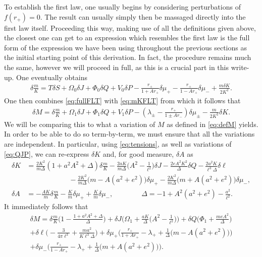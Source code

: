 \documentclass[
twoside,
openright,
frontopenright,
]{dmathesis}
\newcommand{\nn}{\nonumber}
\begin{document}
To establish the first law, one usually begins by considering perturbations of
$f(r_+)=0$. The result can usually simply then be massaged directly into the
first law itself. Proceeding this way, making use of all the definitions given
above, the closest one can get to an expression which resembles the first law is
the full form of the expression we have been using throughout the previous
sections as the initial starting point of this derivation. In fact, the
procedure remains much the same, however we will proceed in full, as this is a
crucial part in this write-up. One eventually obtains
\begin{align}\label{eq:mKFLT}
\delta \frac{m}{K} = T\delta S + \Omega_0 \delta J + \Phi_0 \delta Q + V_0
  \delta P - \frac{r_+}{1+Ar_+} \delta \mu_+ - \frac{r_+}{1-Ar_+}\delta \mu_-
  +\frac{m\delta K}{2K^2}. 
\end{align}
One then combines \cref{eq:fullFLT} with \cref{eq:mKFLT} from which it follows that
\begin{align}
\delta M = \delta \frac{m}{K} + \Omega_1 \delta J + \Phi_1 \delta Q + V_1 \delta
  P - \left(\lambda_\pm - \frac{r_+}{1\pm Ar_-}\right) \delta \mu_\pm -
  \frac{m}{2K^2}\delta K. 
\end{align}
We will be comparing this to what a variation of $M$ as defined in
\cref{eq:defM} yields. In order to be able to do so term-by-term, we must ensure
that all the variations are independent. In particular, using
\cref{eq:tensions}, as well as variations of \cref{eq:QJP}, we can re-express
$\delta K$ and, for good measure, $\delta A$ as
\begin{align}
\delta K &=\frac{2K^2}{m\Delta}(1+a^2A^2+\Delta) \delta \frac{m}{K} \nn -
           \frac{2aK}{m\Delta}\Big(A^2-\frac{1}{\ell^2}\Big)\delta
           J-\frac{2eA^2K^2}{\Delta}\delta Q-\frac{2a^2K}{\ell^3\Delta}\delta
           \ell\\ 
&\qquad\qquad\qquad -\frac{2K^2}{m\Delta}\big(m-A(a^2+e^2)\big)\delta\mu_+
                     -\frac{2K^2}{m\Delta}\big(m+A(a^2+e^2)\big)\delta\mu_-,
                     \nn\\ 
\delta A &=-\frac{A K}{m}\delta\frac{m}{K}-\frac{K}{m}\delta\mu_+ +
           \frac{K}{m}\delta \mu_-, \qquad \qquad \Delta =
           -1+A^2(a^2+e^2)-\frac{a^2}{\ell^2}. 
\label{eq:dKdA}
\end{align}
It immediately follows that
\begin{multline}
\delta M = \delta\frac{m}{K} \Big(1-\frac{1+a^2A^2+\Delta}{\Delta}\Big) 
+\delta J \bigg(\Omega_1+\frac{aK}{\Delta}\Big(A^2-\frac{1}{\ell^2}\Big)\bigg) 
+\delta Q \bigg(\Phi_1+\frac{meA^2}{\Delta}\bigg) \\
+\delta\ell \Big(-\frac{3}{4\pi\ell^3}+\frac{ma^2}{K\ell^3\Delta}\Big) 
+\delta \mu_+\Big(\frac{r_+}{1+Ar_+}-\lambda_+
+\frac{1}{\Delta}\big(m-A(a^2+e^2)\big)\Big)\\ 
+\delta \mu_-\Big(\frac{r_+}{1-Ar_+}-\lambda_+
+\frac{1}{\Delta}\big(m+A(a^2+e^2)\big)\Big). 
\label{eq:dM1}
\end{multline}
\end{document}
